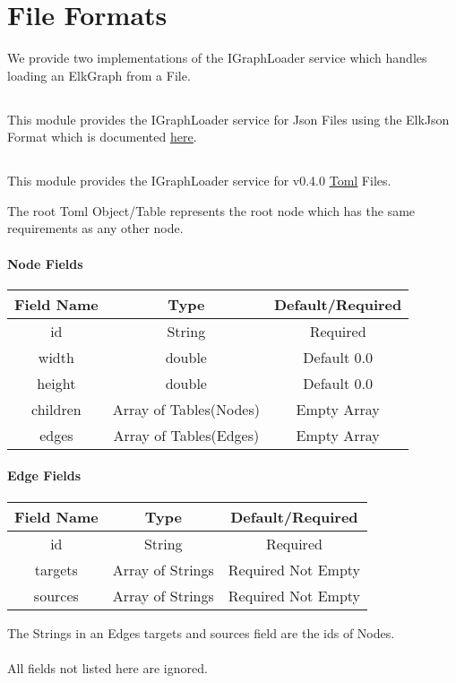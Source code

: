 \section{File Formats}

We provide two implementations of the IGraphLoader service
which handles loading an ElkGraph from a File.

\subsection{}

This module provides the IGraphLoader service for Json Files using the ElkJson Format which is documented \underline{\href{https://www.eclipse.org/elk/documentation/tooldevelopers/graphdatastructure/jsonformat.html}{here}}.

\subsection{}

This module provides the IGraphLoader service for v0.4.0 \underline{\href{https://github.com/toml-lang/toml}{Toml}} Files.

The root Toml Object/Table represents the root node which
has the same requirements as any other node.

\paragraph{Node Fields}
\begin{tabular}{|c|c|c|}
\hline 
Field Name & Type & Default/Required \\ 
\hline 
id & String & Required \\ 
\hline 
width & double & Default 0.0 \\ 
\hline 
height & double & Default 0.0 \\ 
\hline 
children & Array of Tables(Nodes) & Empty Array \\ 
\hline 
edges & Array of Tables(Edges) & Empty Array \\ 
\hline 
\end{tabular} 

\paragraph{Edge Fields}
\begin{tabular}{|c|c|c|}
\hline 
Field Name & Type & Default/Required \\ 
\hline 
id & String & Required \\ 
\hline 
targets & Array of Strings & Required Not Empty \\ 
\hline 
sources & Array of Strings & Required Not Empty \\ 
\hline 
\end{tabular} 

The Strings in an Edges targets and sources field are the ids of Nodes.

\paragraph{}
All fields not listed here are ignored.